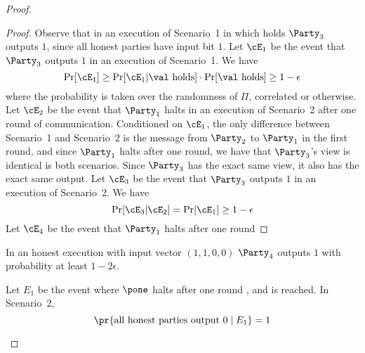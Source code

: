 \begin{proof}
\begin{proof}
 Observe that in an execution of Scenario~1 in which \val holds $\Party_3$ outputs $1$, since all honest parties have input bit $1$. Let $\cE_1$ be the event that $\Party_3$ outputs $1$ in an execution of Scenario~1. We have
 \[
 \Pr[\cE_1] \geq \Pr[\cE_1 | \text{\val holds}] \cdot \Pr[\text{\val holds}] \geq 1-\epsilon
 \]
 where the probability is taken over the randomness of $\Pi$, correlated or otherwise.
 Let $\cE_2$ be the event that $\Party_1$ halts in an execution of Scenario~2 after one round of communication. Conditioned on $\cE_1$, the only difference between Scenario~1 and Scenario~2 is the message from $\Party_2$ to $\Party_1$ in the first round, and since $\Party_1$ halts after one round, we have that $\Party_3$'s view is identical is both scenarios. Since $\Party_3$ has the exact same view, it also has the exact same output. Let $\cE_3$ be the event that $\Party_3$ outputs $1$ in an execution of Scenario~2. We have
 \[
 \Pr[\cE_3 | \cE_2] = \Pr[\cE_1] \geq 1-\epsilon
 \]
 Let $\cE_4$ be the event that $\Party_1$ halts after one round
\end{proof}

\begin{claim}\label{claim:4.2}
	In an honest execution with input vector $(1,1,0,0)$ $\Party_4$ outputs $1$ with probability at least $1-2\epsilon$.
\end{claim}


\begin{claim}\label{claim:4.5}
Let $E_1$ be the event where $\pone$ halts after one round , and \agr is reached. In Scenario~2,
\[
\pr{\text{all honest parties output } 0 \mid E_1}= 1
\]
\end{claim}


\end{proof}

